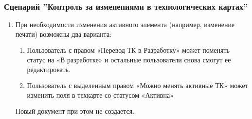 \subsubsection{Сценарий ''Контроль за изменениями в технологических картах''}
\label{bp:pm_4}


\begin{enumerate}

\item	При необходимости изменения активного элемента   (например, изменение печати) возможны два варианта:

\begin{enumerate}
\item	Пользователь с правом «Перевод ТК в Разработку» может поменять статус  на «В разработке» и остальные пользователи снова смогут ее редактировать.
\item	Пользователь с выделенным правом «Можно менять активные ТК» может изменить поля в техкарте со статусом «Активна»
\end{enumerate}
Новый документ  при этом не создается.
\end{enumerate}





